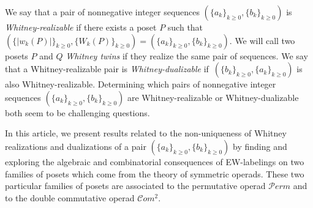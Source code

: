 \documentclass[11pt]{article}
\theoremstyle{definition}
\numberwithin{equation}{section}
\newcommand{\Perm}{\mathcal{P}erm}
\newcommand{\Com}{\mathcal{C}om}
\begin{document}
We say that a pair of nonnegative integer sequences $(\{a_k\}_{k\ge 0},\{b_k\}_{k\ge 0})$ is \emph{Whitney-realizable} if there exists a poset $P$ such that $(\{|w_k(P)|\}_{k\ge 0},\{W_k(P)\}_{k\ge 0})=(\{a_k\}_{k\ge 0},\{b_k\}_{k\ge 0})$. We will call two posets $P$ and $Q$ \emph{Whitney twins} if they realize the same pair of sequences. We say that a Whitney-realizable pair is \emph{Whitney-dualizable} if~$(\{b_k\}_{k\ge 0},\{a_k\}_{k\ge 0})$ is also Whitney-realizable.
Determining which pairs of nonnegative integer sequences $(\{a_k\}_{k\ge 0},\{b_k\}_{k\ge 0})$ are Whitney-realizable or Whitney-dualizable both seem to be challenging questions.

  
In this article, we present results related to the non-uniqueness of Whitney realizations and dualizations of a pair $(\{a_k\}_{k\ge 0},\{b_k\}_{k\ge 0})$ by finding and exploring the algebraic and combinatorial consequences of EW-labelings on two families of posets which come from the theory of symmetric operads. These two particular families of posets are associated to the permutative operad $\Perm$ and to the double commutative operad $\Com^2$.

  
\end{document}
